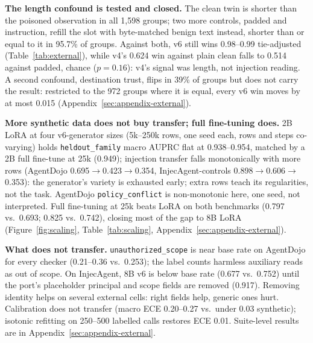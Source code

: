 \textbf{The length confound is tested and closed.} The clean twin is shorter
than the poisoned observation in all 1,598 groups; two more controls,
padded and instruction, refill the slot with byte-matched benign text
instead, shorter than or equal to it in 95.7\% of groups. Against both, v6
still wins 0.98--0.99 tie-adjusted (Table~\ref{tab:external}), while v4's
0.624 win against plain clean falls to 0.514 against padded, chance
($p=0.16$): v4's signal was length, not injection reading. A second
confound, destination trust, flips in 39\% of groups but does not carry the
result: restricted to the 972 groups where it is equal, every v6 win moves
by at most 0.015 (Appendix~\ref{sec:appendix-external}).

\textbf{More synthetic data does not buy transfer; full fine-tuning does.}
2B LoRA at four v6-generator sizes (5k--250k rows, one seed each, rows and
steps co-varying) holds \texttt{heldout\_family} macro AUPRC flat at
0.938--0.954, matched by a 2B full fine-tune at 25k (0.949); injection
transfer falls monotonically with more rows (AgentDojo
0.695$\to$0.423$\to$0.354, InjecAgent-controls 0.898$\to$0.606$\to$0.353):
the generator's variety is exhausted early; extra rows teach its
regularities, not the task. AgentDojo \texttt{policy\_conflict} is
non-monotonic here, one seed, not interpreted. Full fine-tuning at 25k
beats LoRA on both benchmarks (0.797 vs.\ 0.693; 0.825 vs.\ 0.742), closing
most of the gap to 8B LoRA (Figure~\ref{fig:scaling},
Table~\ref{tab:scaling}, Appendix~\ref{sec:appendix-external}).

\textbf{What does not transfer.} \texttt{unauthorized\_scope} is near base
rate on AgentDojo for every checker (0.21--0.36 vs.\ 0.253); the label counts
harmless auxiliary reads as out of scope. On InjecAgent, 8B v6 is below base
rate (0.677 vs.\ 0.752) until the port's placeholder principal and scope
fields are removed (0.917). Removing identity helps on several external
cells: right fields help, generic ones hurt. Calibration does not transfer (macro ECE 0.20--0.27 vs.\ under 0.03
synthetic); isotonic refitting on 250--500 labelled calls restores ECE
0.01. Suite-level results are in Appendix~\ref{sec:appendix-external}.

\FloatBarrier
